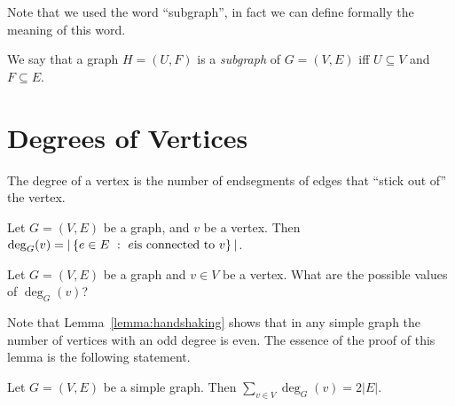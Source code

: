 Note that we used the word ``subgraph'', in fact we can define formally the
meaning of this word.
\begin{definition}
  We say that a graph $H = (U, F)$ is a \emph{subgraph} of $G = (V, E)$ iff
  $U \subseteq V$ and $F \subseteq E$.
\end{definition}

\section{Degrees of Vertices}
The degree of a vertex is the number of endsegments of edges that ``stick out
of'' the vertex.
\begin{definition}
  Let $G = (V, E)$ be a graph, and $v$ be a vertex. Then
  $\deg_G(v) = |\set[{e \text{is connected to } v}]{e \in E}|$.
\end{definition}

\begin{exercise}
  Let $G = (V, E)$ be a graph and $v \in V$ be a vertex.
  What are the possible values of $\deg_G(v)$?
\end{exercise}

Note that Lemma~\ref{lemma:handshaking} shows that in any simple graph the
number of vertices with an odd degree is even.
The essence of the proof of this lemma is the following statement.
\begin{theorem}
\label{theorem:handshaking-graphs}
  Let $G = (V, E)$ be a simple graph. Then $\sum_{v \in V} \deg_G(v) = 2|E|$.
\end{theorem}

